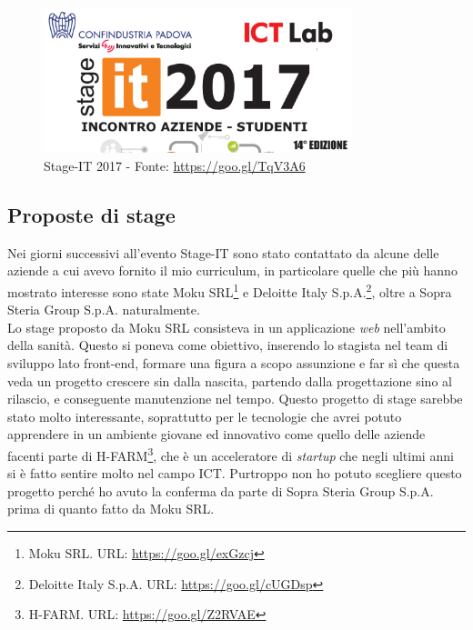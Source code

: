 	\begin{figure}[H]
		\centering
	   	\includegraphics[width=0.8\textwidth]{immagini/StageIT}
	   	\caption{Stage-IT 2017 - Fonte: \url{https://goo.gl/TqV3A6}}
	\end{figure}

\subsection{Proposte di stage}

Nei giorni successivi all'evento Stage-IT sono stato contattato da alcune delle aziende a cui avevo fornito il mio curriculum, in particolare quelle che più hanno mostrato interesse sono state Moku SRL\footnote{Moku SRL. URL: \url{https://goo.gl/exGzcj}} e Deloitte Italy S.p.A.\footnote{Deloitte Italy S.p.A. URL: \url{https://goo.gl/cUGDsp}}, oltre a Sopra Steria Group S.p.A. naturalmente.\\

Lo stage proposto da Moku SRL consisteva in un applicazione \textit{web} nell'ambito della sanità. Questo si poneva come obiettivo, inserendo lo stagista nel team di sviluppo lato front-end\glossario, formare una figura a scopo assunzione e far sì che questa veda un progetto crescere sin dalla nascita, partendo dalla progettazione sino al rilascio, e conseguente manutenzione nel tempo. Questo progetto di stage sarebbe stato molto interessante, soprattutto per le tecnologie che avrei potuto apprendere in un ambiente giovane ed innovativo come quello delle aziende facenti parte di H-FARM\footnote{H-FARM. URL: \url{https://goo.gl/Z2RVAE}}, che è un acceleratore di \textit{startup} che negli ultimi anni si è fatto sentire molto nel campo ICT. Purtroppo non ho potuto scegliere questo progetto perché ho avuto la conferma da parte di Sopra Steria Group S.p.A. prima di quanto fatto da Moku SRL.\\

